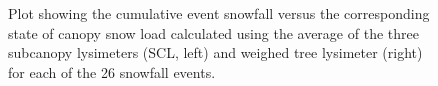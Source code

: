 \documentclass[
  letterpaper,
  DIV=11,
  numbers=noendperiod]{scrartcl}
\begin{document}
\begin{figure}[H]


\caption{\label{fig-scl-w-sf}Plot showing the cumulative event snowfall
versus the corresponding state of canopy snow load calculated using the
average of the three subcanopy lysimeters (SCL, left) and weighed tree
lysimeter (right) for each of the 26 snowfall events.}

\end{figure}%

\pagebreak
{}
\end{document}
